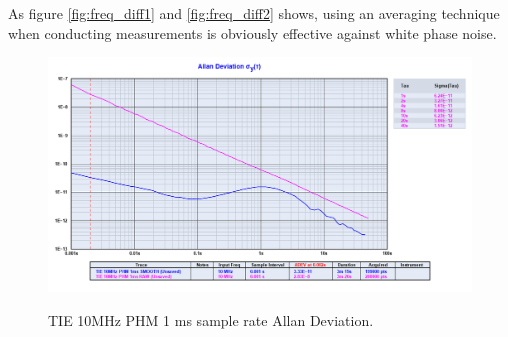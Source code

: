 \documentclass[11pt,english,a4paper]{article}
\begin{document}
\begin{figure}[!htb]
  \centering
  \hfill
\end{figure}
As figure \ref{fig:freq_diff1} and \ref{fig:freq_diff2} shows, using an averaging technique when conducting measurements is obviously effective against white phase noise.

\begin{figure}[!htb]
  \caption{TIE 10MHz PHM 1 ms sample rate Allan Deviation.}
  \centering
    \includegraphics[width=1\textwidth]{tie_10mhz_phm_1ms_allan.png}
    \label{fig:PHM_10MHz_allan_dev}
\end{figure}
\end{document}
